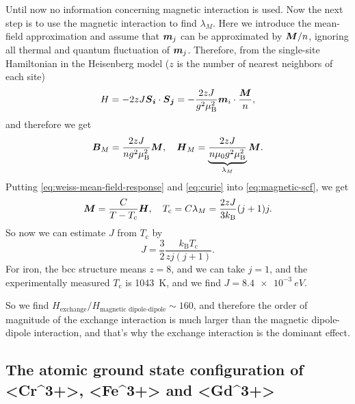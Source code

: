 \documentclass[hyperref, a4paper]{article}
\def\ce#1{<#1>}%
\newcommand*{\Tc}{T_{\text{c}}}
\newcommand*{\muB}{\mu_{\text{B}}}
\newcommand*{\kB}{k_{\text{B}}}
\begin{document}
Until now no information concerning magnetic interaction is used. 
Now the next step is to use the magnetic interaction 
to find $\lambda_M$.
Here we introduce the mean-field approximation 
and assume that $\vb*{m}_j$ can be approximated by $\vb*{M} / n$, 
ignoring all thermal and quantum fluctuation of $\vb*{m}_j$.
Therefore, from the single-site Hamiltonian in the Heisenberg model
($z$ is the number of nearest neighbors of each site)
\begin{equation}
    H = - 2 z J \vb*{S}_{\vb*{i}} \cdot \vb*{S}_{\vb*{j}} 
    = - \frac{2 z J}{g^2 \muB^2} \vb*{m}_i \cdot \frac{\vb*{M}}{n},
    \label{eq:heisenberg.mf-ham}
\end{equation}
and therefore we get 
\begin{equation}
    \vb*{B}_M = \frac{2 z J}{n g^2 \muB^2} \vb*{M}, \quad 
    \vb*{H}_M = \underbrace{\frac{2 z J}{n \mu_0 g^2 \muB^2}}_{\lambda_M} \vb*{M}.
    \label{eq:weiss-mean-field-response}
\end{equation}
Putting \eqref{eq:weiss-mean-field-response} 
and \eqref{eq:curie} into \eqref{eq:magnetic-scf}, 
we get 
\begin{equation}
    \vb*{M} = \frac{C}{T - \Tc} \vb*{H}, \quad 
    \Tc = C \lambda_M = \frac{2 z J}{3 \kB} (j + 1) j.
\end{equation}
So now we can estimate $J$ from $\Tc$ by 
\begin{equation}
    J = \frac{3}{2} \frac{\kB \Tc}{z j (j + 1)}.
\end{equation}
For iron, the bcc structure means $z = 8$, 
and we can take $j = 1$,
and the experimentally measured $\Tc$ is \SI{1043}{K},
and we find $J = \SI{8.4e-3}{eV}$.

So we find $H_{\text{exchange}} / H_{\text{magnetic dipole-dipole}} \sim 160$,
and therefore the order of magnitude of the exchange interaction 
is much larger than the magnetic dipole-dipole interaction,
and that's why the exchange interaction is the dominant effect.

\subsection{The atomic ground state configuration of \ce{Cr^{3+}}, \ce{Fe^{3+}} and \ce{Gd^{3+}}}
\end{document}
